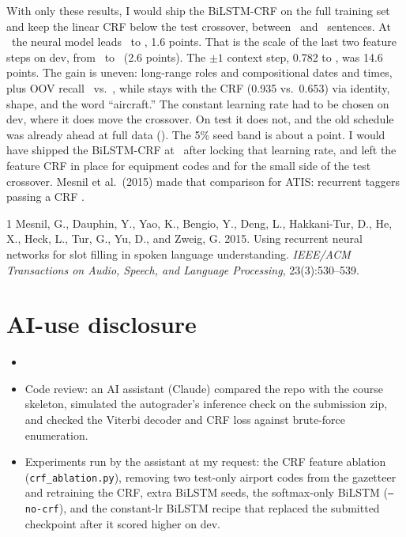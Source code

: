 \documentclass[10pt,twocolumn]{article}
\newif\ifshowtodos \showtodosfalse %
\newcommand{\todo}[1]{\ifshowtodos{\color{red!70!black}\textbf{[TODO:} #1\textbf{]}}\fi}
\newcommand{\slot}[1]{\texttt{\detokenize{#1}}}
\begin{document}
With only these results, I would ship the BiLSTM-CRF on the full training set
and keep the linear CRF below the test crossover, between \nSentTen\ and
\nSentTwentyFive\ sentences.
At \nSentFull\ the neural model leads \lstmTestFull\ to \crfTestFull, 1.6
points. That is the scale of the last two feature steps on dev, from
\crfDevCtxOne\ to \crfDevFull\ (2.6 points). The $\pm1$ context step, 0.782 to
\crfDevCtxOne, was 14.6 points.
The gain is uneven: long-range roles and compositional dates and times, plus
OOV recall \lstmOovRecall\ vs.\ \crfOovRecall, while \slot{aircraft_code} stays
with the CRF (0.935 vs.\ 0.653) via identity, shape, and the word ``aircraft.''
The constant learning rate had to be chosen on dev, where it does move the
crossover. On test it does not, and the old schedule was already ahead at full
data (\oldLstmTestFull). The 5\% seed band is about a point. I would have
shipped the BiLSTM-CRF at \nSentFull\ after locking that learning rate, and
left the feature CRF in place for equipment codes and for the small side of the
test crossover.
Mesnil et al.\ (2015) made that comparison for ATIS: recurrent taggers
passing a CRF \cite{mesnil2015}.

\begingroup
\footnotesize
\setlength{\itemsep}{0pt}
\begin{thebibliography}{1}
Mesnil, G., Dauphin, Y., Yao, K., Bengio, Y., Deng, L., Hakkani-Tur, D.,
He, X., Heck, L., Tur, G., Yu, D., and Zweig, G. 2015.
Using recurrent neural networks for slot filling in spoken language understanding.
\textit{IEEE/ACM Transactions on Audio, Speech, and Language Processing},
23(3):530--539.
\end{thebibliography}
\endgroup

\clearpage
\appendix
\section*{AI-use disclosure}
\todo{Name the tools and versions you used.}
\begin{itemize}
  \item \todo{What you wrote yourself and what AI wrote (e.g.\ boilerplate in
  \texttt{train.py}, \texttt{models/}, helper scripts).}
  \item Code review: an AI assistant (Claude) compared the repo with the course
  skeleton, simulated the autograder's inference check on the submission zip, and
  checked the Viterbi decoder and CRF loss against brute-force enumeration.
  \item Experiments run by the assistant at my request: the CRF feature ablation
  (\texttt{crf\_ablation.py}), removing two test-only airport codes from the
  gazetteer and retraining the CRF, extra BiLSTM seeds, the softmax-only BiLSTM
  (\texttt{--no-crf}), and the constant-lr BiLSTM recipe that replaced the
  submitted checkpoint after it scored higher on dev.
\end{itemize}
\end{document}
